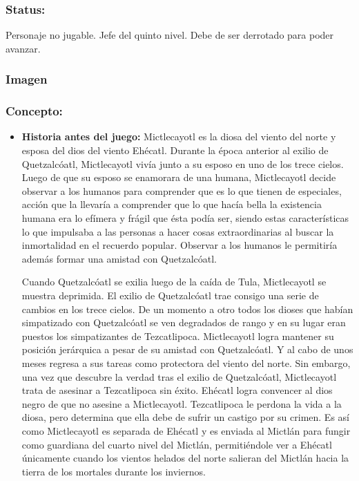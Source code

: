 \documentclass[11pt,letterpaper]{article}
\begin{document}
\subsubsection{Status:}
Personaje no jugable.
Jefe del quinto nivel. Debe de ser derrotado para poder avanzar.
\subsubsection{Imagen}
\subsubsection{Concepto:}
\begin{itemize}
	\item \textbf{Historia antes del juego:}
	Mictlecayotl es la diosa del viento del norte y esposa del dios del viento Ehécatl. Durante la época anterior al exilio de Quetzalcóatl, Mictlecayotl vivía junto a su esposo en uno de los trece cielos. Luego de que su esposo se enamorara de una humana,  Mictlecayotl decide observar a los humanos para comprender que es lo que tienen de especiales, acción que la llevaría a comprender que lo que hacía bella la existencia humana era lo efímera y frágil que ésta podía ser, siendo estas características lo que impulsaba a las personas a hacer cosas extraordinarias al buscar la inmortalidad en el recuerdo popular. Observar a los humanos le permitiría además formar una amistad con Quetzalcóatl.
	\\
	\par
	Cuando Quetzalcóatl se exilia luego de la caída de Tula,  Mictlecayotl se muestra deprimida. El exilio de Quetzalcóatl trae consigo una serie de cambios en los trece cielos. De un momento a otro todos los dioses que habían simpatizado con Quetzalcóatl se ven degradados de rango y en su lugar eran puestos los simpatizantes de Tezcatlipoca. Mictlecayotl logra mantener su posición jerárquica a pesar de su amistad con Quetzalcóatl. Y al cabo de unos meses regresa a sus tareas como protectora del viento del norte. Sin embargo, una vez que descubre la verdad tras el exilio de Quetzalcóatl,  Mictlecayotl trata de asesinar a Tezcatlipoca sin éxito. Ehécatl logra convencer al dios negro de que no asesine a Mictlecayotl. Tezcatlipoca le perdona la vida a la diosa, pero determina que ella debe de sufrir un castigo por su crimen. Es así como Mictlecayotl es separada de Ehécatl y es enviada al Mictlán para fungir como guardiana del cuarto nivel del Mictlán, permitiéndole ver a Ehécatl únicamente cuando los vientos helados del norte salieran del Mictlán hacia la tierra de los mortales durante los inviernos.			

\end{itemize}
\end{document}
